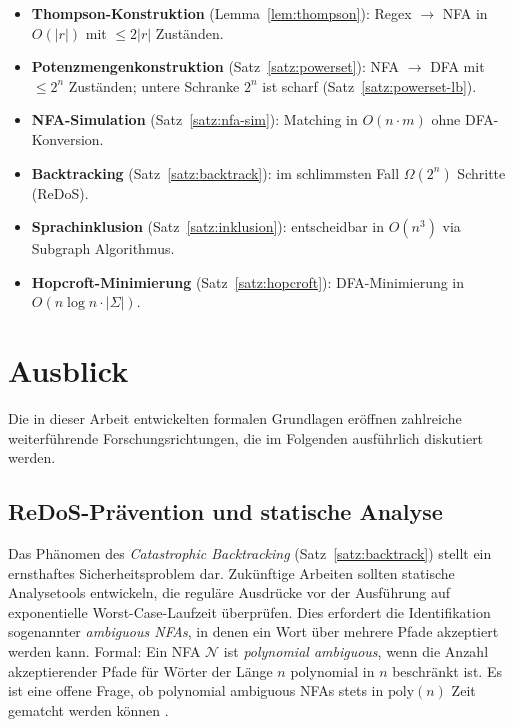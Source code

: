 ﻿\documentclass[a4paper,12pt]{article}
\theoremstyle{definition}
\begin{document}
\begin{itemize}
	\item \textbf{Thompson-Konstruktion} (Lemma~\ref{lem:thompson}): Regex $\to$
	      NFA in $O(|r|)$ mit $\leq 2|r|$ Zuständen.
	\item \textbf{Potenzmengenkonstruktion} (Satz~\ref{satz:powerset}): NFA $\to$
	      DFA mit $\leq 2^n$ Zuständen; untere Schranke $2^n$ ist scharf
	      (Satz~\ref{satz:powerset-lb}).
	\item \textbf{NFA-Simulation} (Satz~\ref{satz:nfa-sim}): Matching in
	      $O(n \cdot m)$ ohne DFA-Konversion.
	\item \textbf{Backtracking} (Satz~\ref{satz:backtrack}): im schlimmsten Fall
	      $\Omega(2^n)$ Schritte (ReDoS).
	\item \textbf{Sprachinklusion} (Satz~\ref{satz:inklusion}): entscheidbar in
	      $O(n^3)$ via Subgraph Algorithmus.
	\item \textbf{Hopcroft-Minimierung} (Satz~\ref{satz:hopcroft}): DFA-Minimierung
	      in $O(n \log n \cdot |\Sigma|)$.
\end{itemize}

\section{Ausblick}

Die in dieser Arbeit entwickelten formalen Grundlagen eröffnen zahlreiche
weiterführende Forschungsrichtungen, die im Folgenden ausführlich diskutiert werden.

\subsection{ReDoS-Prävention und statische Analyse}

Das Phänomen des \emph{Catastrophic Backtracking} (Satz~\ref{satz:backtrack})
stellt ein ernsthaftes Sicherheitsproblem dar. Zukünftige Arbeiten sollten
statische Analysetools entwickeln, die reguläre Ausdrücke vor der Ausführung auf
exponentielle Worst-Case-Laufzeit überprüfen. Dies erfordert die Identifikation
sogenannter \emph{ambiguous NFAs}, in denen ein Wort über mehrere Pfade akzeptiert
werden kann. Formal: Ein NFA $\mathcal{N}$ ist \emph{polynomial ambiguous}, wenn
die Anzahl akzeptierender Pfade für Wörter der Länge $n$ polynomial in $n$
beschränkt ist. Es ist eine offene Frage, ob polynomial ambiguous NFAs stets in
$\mathrm{poly}(n)$ Zeit gematcht werden können \cite{shen2018,weideman2016}.
\end{document}

